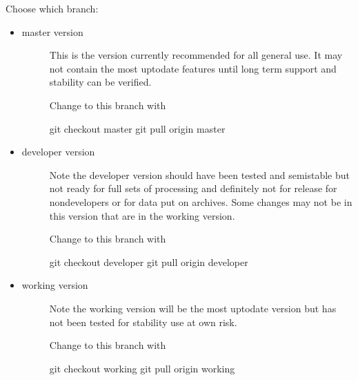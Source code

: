 \documentclass[a4paper,10pt,english]{report}
\begin{document}
Choose which branch:
\begin{itemize}
\item {} \begin{description}
\item[{master version}] \leavevmode
This is the version currently recommended for all general use.
It may not contain the most up\sphinxhyphen{}to\sphinxhyphen{}date features until long term support
and stability can be verified.

Change to this branch with

\begin{sphinxVerbatim}[commandchars=\\\{\}]
git checkout master
git pull origin master
\end{sphinxVerbatim}

\end{description}

\item {} \begin{description}
\item[{developer version}] \leavevmode
Note the developer version should have been tested and semi\sphinxhyphen{}stable but
not ready for full sets of processing and definitely not for release for
non\sphinxhyphen{}developers or for data put on archives. Some changes may not be
in this version that are in the working version.

Change to this branch with

\begin{sphinxVerbatim}[commandchars=\\\{\}]
git checkout developer
git pull origin developer
\end{sphinxVerbatim}

\end{description}

\item {} \begin{description}
\item[{working version}] \leavevmode
Note the working version will be the most up\sphinxhyphen{}to\sphinxhyphen{}date version but has not been
tested for stability \sphinxhyphen{} use at own risk.

Change to this branch with

\begin{sphinxVerbatim}[commandchars=\\\{\}]
git checkout working
git pull origin working
\end{sphinxVerbatim}

\end{description}

\end{itemize}
\end{document}
